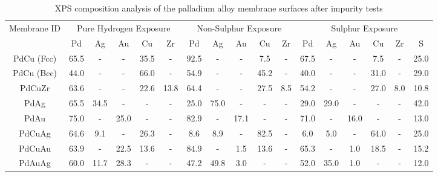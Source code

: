 \begin{landscape}
\begin{table}[]
    \centering
    \caption{XPS composition analysis of the palladium alloy membrane surfaces after impurity tests}
    \label{results:4}
    \begin{tabular}{@{}ccccccccccccccccc@{}}
    \toprule
    \multirow{2}{*}{Membrane ID} & \multicolumn{5}{c}{Pure Hydrogen Exposure} & \multicolumn{5}{c}{Non-Sulphur Exposure} & \multicolumn{6}{c}{Sulphur Exposure} \\
                                 & Pd     & Ag     & Au     & Cu     & Zr     & Pd      & Ag     & Au    & Cu     & Zr   & Pd    & Ag  & Au  & Cu   & Zr & S    \\ \midrule
    PdCu (Fcc)                   & 65.5   & -      & -      & 35.5   & -      & 92.5    & -      & -     & 7.5    & -    & 67.5  & -   & -   & 7.5  & -  & 25.0   \\
    PdCu (Bcc)                   & 44.0     & -      & -      & 66.0     & -      & 54.9   & -      & -     & 45.2  & -    & 40.0    & -   & -   & 31.0   & -  & 29.0   \\
    PdCuZr                       & 63.6   & -      & -      & 22.6   & 13.8   & 64.4    & -      & -     & 27.5   & 8.5  & 54.2  & -   & -   & 27.0   & 8.0  & 10.8 \\
    PdAg                         & 65.5   & 34.5   & -      & -      & -      & 25.0      & 75.0     & -     & -      & -    & 29.0    & 29.0  & -   & -    & -  & 42.0   \\
    PdAu                         & 75.0     & -      & 25.0     & -      & -      & 82.9    & -      & 17.1  & -      & -    & 71.0    & -   & 16.0  & -    & -  & 13.0   \\
    PdCuAg                       & 64.6   & 9.1    & -      & 26.3   & -      & 8.6     & 8.9    & -     & 82.5   & -    & 6.0     & 5.0   & -   & 64.0   & -  & 25.0   \\
    PdCuAu                       & 63.9   & -      & 22.5   & 13.6   & -      & 84.9    & -      & 1.5  & 13.6   & -    & 65.3  & -   & 1.0   & 18.5 & -  & 15.2 \\
    PdAuAg                       & 60.0     & 11.7   & 28.3   & -      & -      & 47.2    & 49.8   & 3.0     & -      & -    & 52.0    & 35.0  & 1.0   & -    & -  & 12.0   \\ \bottomrule
    \end{tabular}
    \end{table}
\end{landscape}

